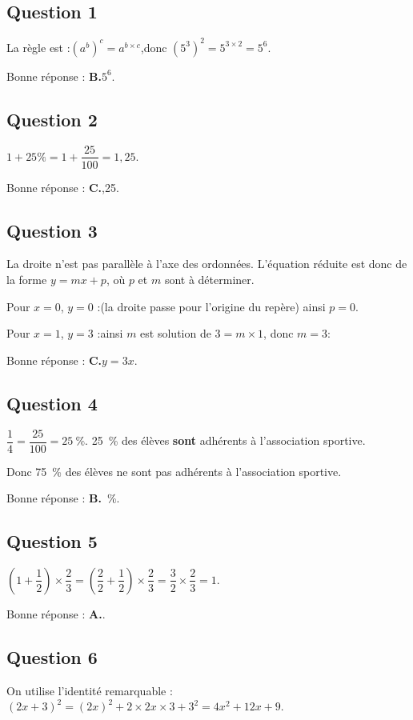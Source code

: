 \subsection*{Question 1}
	La règle est :\quad $\left(a^b\right)^c = a^{b \times c}$,\quad donc \quad $\left(5^{3}\right)^{2}=  5^{3\times 2} = 5^6$.

	Bonne réponse : \textbf{B.}\quad $5^6$.

\subsection*{Question 2}
	$ 1 + 25\% = 1+\dfrac{25}{100} = 1,25$.

	Bonne réponse : \textbf{C.},25.

\subsection*{Question 3}
	La droite n'est pas parallèle à l'axe des ordonnées. L'équation réduite est donc de la forme $y=mx+p$, où $p$ et $m$ sont à déterminer.

	Pour $x=0$, $y=0$ :\quad (la droite passe pour l'origine du repère) ainsi $p=0$.

	Pour $x=1$, $y=3$ :\quad ainsi $m$ est solution de $3 = m\times 1$, donc $m=3$:

	Bonne réponse : \textbf{C.}\quad $y=3x$.

\subsection*{Question 4}
	$\dfrac{1}{4} = \dfrac{25}{100} = 25~\%$. 25~\% des élèves \textbf{sont} adhérents à l'association sportive.

	Donc 75~\% des élèves ne sont pas adhérents à l'association sportive.

	Bonne réponse : \textbf{B.}~\%.

\subsection*{Question 5}
	$\left(1+\dfrac{1}{2}\right)\times\dfrac{2}{3} = \left(\dfrac{2}{2}+\dfrac{1}{2}\right)\times\dfrac{2}{3} = \dfrac{3}{2}\times \dfrac{2}{3} = 1 $.

	Bonne réponse : \textbf{A.}.

\subsection*{Question 6}
	On utilise l'identité remarquable :\quad $(2x+3)^2 = (2x)^2+2\times 2x \times 3 + 3^2 = 4x^2 + 12x + 9$.

